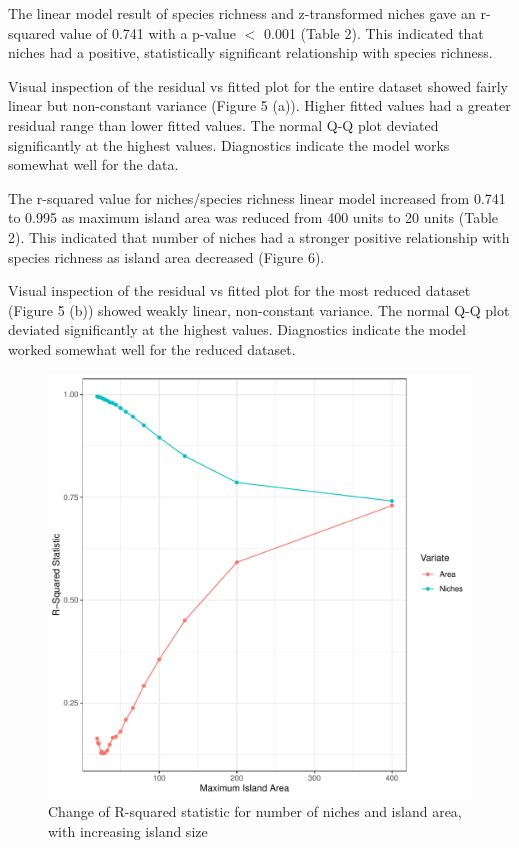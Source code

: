 \documentclass{article}
\begin{document}
\noindent The linear model result of species richness and z-transformed niches gave an r-squared value of 0.741 with a p-value $<$ 0.001 (Table 2). This indicated that niches had a positive, statistically significant relationship with species richness. \bigskip

\noindent Visual inspection of the residual vs fitted plot for the entire dataset showed fairly linear but non-constant variance (Figure 5 (a)). Higher fitted values had a greater residual range than lower fitted values. The normal Q-Q plot deviated significantly at the highest values. Diagnostics indicate the model works somewhat well for the data. \bigskip

\noindent The r-squared value for niches/species richness linear model increased from 0.741 to 0.995 as maximum island area was reduced from 400 units to 20 units (Table 2). This indicated that number of niches had a stronger positive relationship with species richness as island area decreased (Figure 6). \bigskip

\noindent Visual inspection of the residual vs fitted plot for the most reduced dataset (Figure 5 (b)) showed weakly linear, non-constant variance. The normal Q-Q plot deviated significantly at the highest values.  Diagnostics indicate the model worked somewhat well for the reduced dataset. \bigskip

\begin{figure}[h!]
\centering
  \includegraphics[scale=0.5]{../../../Results/Simulation2/LMRSquared.pdf}
  \caption{Change of R-squared statistic for number of niches and island area, with increasing island size}
  \label{fig:R-Squared statistic}
\end{figure}
\end{document}
